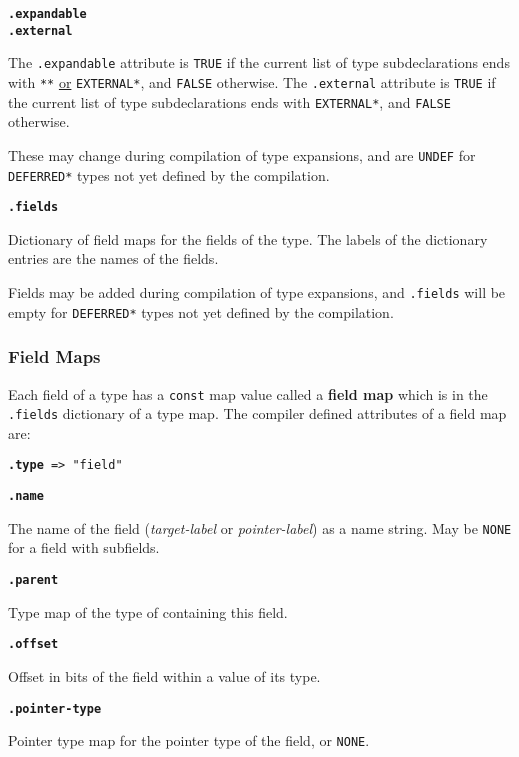 \documentclass[12pt]{article}
\newcommand{\key}[1]{{\rm \bfseries #1}}
\newcommand{\ttkey}[1]{{\tt \bfseries #1}}
\newenvironment{indpar}[1][0.3in]%
	{\begin{list}{}%
		     {\setlength{\itemsep}{0in}%
		      \setlength{\topsep}{0in}%
		      \setlength{\parsep}{1ex}%
		      \setlength{\labelwidth}{#1}%
		      \setlength{\leftmargin}{#1}%
		      \addtolength{\leftmargin}{\labelsep}}%
	 \item}%
	{\end{list}}
\begin{document}
\ttkey{.expandable} \\
\ttkey{.external}
\begin{indpar}
The {\tt .expandable} attribute is {\tt TRUE} if the
current list of type subdeclarations ends with
{\tt ***} \underline{or} {\tt *EXTERNAL*},
and {\tt FALSE} otherwise.
The {\tt .external} attribute is {\tt TRUE} if the current
list of type subdeclarations ends with
{\tt *EXTERNAL*}, and {\tt FALSE} otherwise.

These may change during compilation of type expansions, and are
{\tt UNDEF} for {\tt *DEFER\-RED*} types not yet defined by the
compilation.
\end{indpar}

\ttkey{.fields}
\begin{indpar}
Dictionary of field maps for the fields of the type.  The labels
of the dictionary entries are the names of the fields.

Fields may be added during compilation of type expansions, and {\tt .fields}
will be empty for {\tt *DEFERRED*} types not yet defined by the
compilation.
\end{indpar}

\subsubsection{Field Maps}
\label{FIELD-MAPS}

Each field of a type has a {\tt const} map value called
a \key{field map} which is in the {\tt .fields} dictionary of
a type map.  The compiler defined attributes of a field map are:

{\tt \ttkey{.type} => "field"}

\ttkey{.name}
\begin{indpar}
The name of the field ({\em target-label} or {\em pointer-label})
as a name string.  May be {\tt NONE} for a field with subfields.
\end{indpar}

\ttkey{.parent}
\begin{indpar}
Type map of the type of containing this field.
\end{indpar}

\ttkey{.offset}
\begin{indpar}
Offset in bits of the field within a value of its type.
\end{indpar}

\ttkey{.pointer-type}
\begin{indpar}
Pointer type map for the pointer type of the field,
or {\tt NONE}.
\end{indpar}
\end{document}
